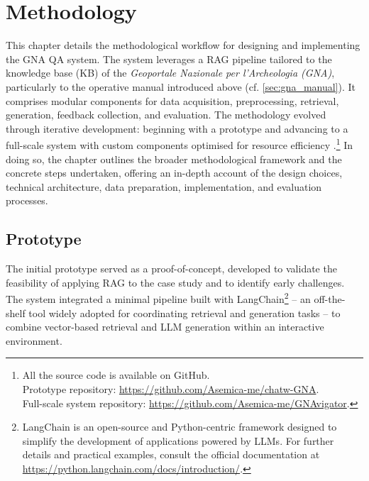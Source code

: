 \chapter{Methodology}
\label{chap:methodology}
\begin{spacing}{1.5}
This chapter details the methodological workflow for designing and implementing the GNA QA system. The system leverages a RAG pipeline tailored to the knowledge base (KB) of the \textit{Geoportale Nazionale per l’Archeologia (GNA)}, particularly to the operative manual introduced above (cf. \autoref{sec:gna_manual}). It comprises modular components for data acquisition, preprocessing, retrieval, generation, feedback collection, and evaluation. The methodology evolved through iterative development: beginning with a prototype \citep{pograri_prototype_2025} and advancing to a full-scale system with custom components optimised for resource efficiency \parencite{pograri_question-answering_2025}.\footnote{All the source code is available on GitHub.\\Prototype repository: \url{https://github.com/Asemica-me/chatw-GNA}.\\Full-scale system repository: \url{https://github.com/Asemica-me/GNAvigator}.} In doing so, the chapter outlines the broader methodological framework and the concrete steps undertaken, offering an in-depth account of the design choices, technical architecture, data preparation, implementation, and evaluation processes.


\section{Prototype}
The initial prototype served as a proof-of-concept, developed to validate the feasibility of applying RAG to the case study and to identify early challenges. The system integrated a minimal pipeline built with LangChain\footnote{LangChain is an open-source and Python-centric framework designed to simplify the development of applications powered by LLMs. For further details and practical examples, consult the official documentation at \url{https://python.langchain.com/docs/introduction/}.}\nocite{noauthor_langchain_2024} -- an off-the-shelf tool widely adopted for coordinating retrieval and generation tasks \citep{mishra_using_2024,akkiraju_facts_2024} -- to combine vector-based retrieval and LLM generation within an interactive environment.


\end{spacing}
